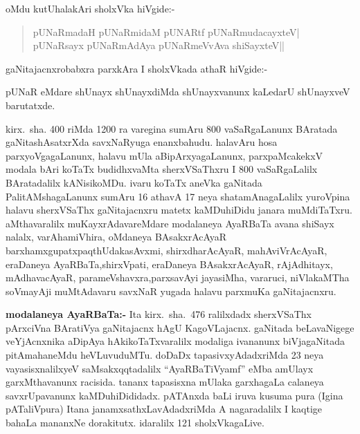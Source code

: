 oMdu kutUhalakAri sholxVka hiVgide:-
\begin{verse}
pUNaRmadaH pUNaRmidaM pUNARtf pUNaRmudacayxteV|\\
pUNaRsayx pUNaRmAdAya pUNaRmeVvAva shiSayxteV||
\end{verse}

gaNitajacnxrobabxra parxkAra I sholxVkada athaR hiVgide:-

pUNaR eMdare shUnayx shUnayxdiMda shUnayxvanunx kaLedarU shUnayxveV barutatxde.

kirx.~sha. {\rm 400} riMda {\rm 1200} ra varegina sumAru {\rm 800} vaSaRgaLanunx BAratada gaNita\-shAsatxrXda savxNaRyuga enanxbahudu. halavAru hosa parxyoVgagaLanunx, halavu mUla aBipArxyagaLanunx, parxpaMcakekxV modala bAri koTaTx budidhxvaMta sherxVSaThxru I {\rm 800} vaSaR\-gaLalilx BAratadalilx kANisikoMDu. ivaru koTaTx aneVka gaNitada PalitAMshagaLanunx sumAru {\rm 16} athavA {\rm 17} neya shatamAnagaLalilx yuroVpina halavu sherxVSaThx gaNita\-jacnxru matetx kaMDuhiDidu janara muMdiTaTxru. aMthavaralilx muKayxrAdavareMdare modalaneya AyaRBaTa avana shiSayx nalalx, varAhamiVhira, oMdaneya BAsakxrAcAyaR barxhamxgupatx\break paqthUdakasAvxmi, shirxdharAcAyaR, mahAviVrAcAyaR, eraDaneya AyaRBaTa,\break shirxVpati, eraDaneya BAsakxrAcAyaR, rAjAdhitayx, mAdhavacAyaR, parameVshavxra,\break parxsavAyi jayasiMha, vararuci, niVlakaMTha soVmayAji muMtAdavaru savxNaR \-yugada halavu parxmuKa gaNitajacnxru.

\textbf{modalaneya AyaRBaTa:-} Ita kirx.~sha.~{\rm 476} ralilxdadx sherxVSaThx pArxciVna BAratiVya gaNitajacnx hAgU KagoVLajacnx. gaNitada beLavaNigege veYjAcnxnika aDipAya hAkikoTaTxvaralilx modaliga ivananunx biVjagaNitada pitAmahaneMdu heVLuvuduMTu. doDaDx tapasivxyAdadxriMda {\rm 23} neya vayasisxnalilxyeV saMsakxqqtadalilx ``AyaRBaTiVyamf'' eMba amUlayx garxMthavanunx racisida. tananx tapasisxna mUlaka garxhagaLa calaneya savxrUpavanunx kaMDuhiDididadx. pATAnxda baLi iruva kusuma pura (Igina pATaliVpura) Itana janamxsathxLavAdadxriMda  A nagaradalilx I kaqtige bahaLa mananxNe dorakitutx. idaralilx {\rm 121} sholxVkagaLive.

